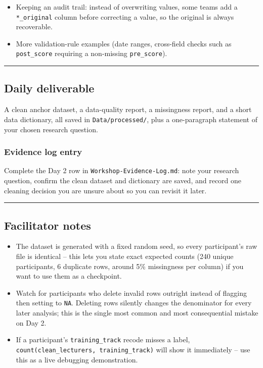 \documentclass[11pt]{article}
\providecommand{\tightlist}{%
  \setlength{\itemsep}{0pt}\setlength{\parskip}{0pt}}
\begin{document}
\begin{itemize}
\tightlist
\item
  Keeping an audit trail: instead of overwriting values, some teams add
  a \texttt{*\_original} column before correcting a value, so the
  original is always recoverable.
\item
  More validation-rule examples (date ranges, cross-field checks such as
  \texttt{post\_score} requiring a non-missing \texttt{pre\_score}).
\end{itemize}

\begin{center}\rule{0.5\linewidth}{0.5pt}\end{center}

\hypertarget{daily-deliverable}{%
\subsection{Daily deliverable}\label{daily-deliverable}}

A clean anchor dataset, a data-quality report, a missingness report, and
a short data dictionary, all saved in \texttt{Data/processed/}, plus a
one-paragraph statement of your chosen research question.

\hypertarget{evidence-log-entry}{%
\subsubsection{Evidence log entry}\label{evidence-log-entry}}

Complete the Day 2 row in \texttt{Workshop-Evidence-Log.md}: note your
research question, confirm the clean dataset and dictionary are saved,
and record one cleaning decision you are unsure about so you can revisit
it later.

\begin{center}\rule{0.5\linewidth}{0.5pt}\end{center}

\hypertarget{facilitator-notes}{%
\subsection{Facilitator notes}\label{facilitator-notes}}

\begin{itemize}
\tightlist
\item
  The dataset is generated with a fixed random seed, so every
  participant's raw file is identical -- this lets you state exact
  expected counts (240 unique participants, 6 duplicate rows, around 5\%
  missingness per column) if you want to use them as a checkpoint.
\item
  Watch for participants who delete invalid rows outright instead of
  flagging then setting to \texttt{NA}. Deleting rows silently changes
  the denominator for every later analysis; this is the single most
  common and most consequential mistake on Day 2.
\item
  If a participant's \texttt{training\_track} recode misses a label,
  \texttt{count(clean\_lecturers,\ training\_track)} will show it
  immediately -- use this as a live debugging demonstration.
\end{itemize}
\end{document}
